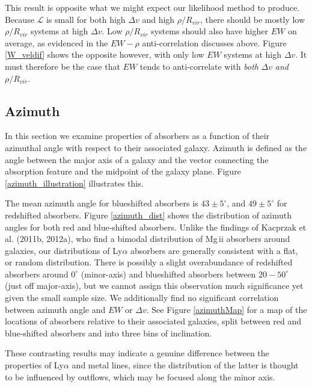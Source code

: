 \documentclass[twocolumn,tighten]{aastex6}
\begin{document}
This result is opposite what we might expect our likelihood method to produce. Because $\mathcal{L}$ is small for both high $\Delta v$ and high $\rho / R_{vir}$, there should be mostly low $\rho / R_{vir}$ systems at high $\Delta v$. Low $\rho / R_{vir}$ systems should also have higher $EW$ on average, as evidenced in the $EW-\rho$ anti-correlation discusses above. Figure \ref{W_veldif} shows the opposite however, with only low $EW$ systems at high $\Delta v$. It must therefore be the case that $EW$ tends to anti-correlate with \textit{both} $\Delta v$ \textit{and} $\rho / R_{vir}$.


\subsection{Azimuth}
\label{azimuth}

In this section we examine properties of absorbers as a function of their azimuthal angle with respect to their associated galaxy. Azimuth is defined as the angle between the major axis of a galaxy and the vector connecting the absorption feature and the midpoint of the galaxy plane. Figure \ref{azimuth_illustration} illustrates this. 

The mean azimuth angle for blueshifted absorbers is $43\pm5^{\circ}$, and $49\pm5^{\circ}$ for redshifted absorbers. Figure \ref{azimuth_dist} shows the distribution of azimuth angles for both red and blue-shifted absorbers. Unlike the findings of Kacprzak et al. (2011b, 2012a), who find a bimodal distribution of Mg\,{\sc ii} absorbers around galaxies, our distributions of Ly$\alpha$ absorbers are generally consistent with a flat, or random distribution. There is possibly a slight overabundance of redshifted absorbers around $0^{\circ}$ (minor-axis) and blueshifted absorbers between $20-50^{\circ}$ (just off major-axis), but we cannot assign this observation much significance yet given the small sample size. We additionally find no significant correlation between azimuth angle and $EW$ or $\Delta v$. See Figure \ref{azimuthMap} for a map of the locations of absorbers relative to their associated galaxies, split between red and blue-shifted absorbers and into three bins of inclination.

These contrasting results may indicate a genuine difference between the properties of Ly$\alpha$ and metal lines, since the distribution of the latter is thought to be influenced by outflows, which may be focused along the minor axis.
\end{document}

